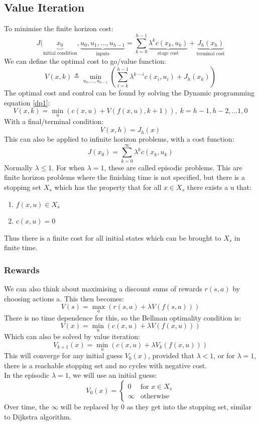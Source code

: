 \documentclass{article}
\begin{document}
\subsection{Value Iteration}
To minimise the finite horizon cost:
\[
J(\underbrace{x_0}_{\text{initial condition}}, \underbrace{u_0,u_1,\hdots,u_{h-1}}_{\text{inputs}} = \sum_{k=0}^{h-1} \underbrace{\lambda^k c(x_k,u_k)}_{\text{stage cost}} + \underbrace{J_h(x_h)}_{\text{terminal cost}}
\]
We can define the optimal cost to go/value function:
\[
V(x,k) \triangleq \min_{u_k,\hdots,u_{h-1}}\left(\sum_{i=k}^{h-1} \lambda^{k-i} c(x_i,u_i) + J_h(x_k)\right)
\]
The optimal cost and control can be found by solving the Dynamic programming equation \eqref{dp1}:
\[
V(x,k) = \min_u (c(x,u) + V(f(x,u),k+1)), \; k=h-1,h-2,...1,0
\]
With a final/terminal condition:
\[
V(x,h) = J_h(x)
\]
This can also be applied to infinite horizon problems, with a cost function:
\[
J(x_0) = \sum_{k=0}^\infty \lambda^k c(x_k,u_k)
\]
Normally $\lambda \leq 1$. For when $\lambda =1$, these are called episodic problems. This are finite horizon problems where the finishing time is not specified, but there is a stopping set $X_s$ which has the property that for all $x \in X_s$ there exists a u that:
\begin{enumerate}
    \item $f(x,u) \in X_s$
    \item $c(x,u) = 0$
\end{enumerate}
Thus there is a finite cost for all initial states which can be brought to $X_s$ in finite time.
\\
\subsubsection*{Rewards}
We can also think about maximising a discount sums of rewards $r(s,a)$ by choosing actions a. This then becomes:
\[
V(s) = \max_a (r(s,a) + \lambda V(f(s,a)))
\]
There is no time dependence for this, so the Bellman optimality condition is:
\[
V(x) = \min_u (c(x,u) + \lambda V(f(x,u)))
\]
Which can also be solved by value iteration:
\[
V_{k+1}(x) = \min_u (c(x,u) + \lambda V_k(f(x,u)))
\]
This will converge for any initial guess $V_0(x)$, provided that $\lambda < 1$, or for $\lambda = 1$, there is a reachable stopping set and no cycles with negative cost. \\
In the episodic $\lambda = 1$, we will use an initial guess:
\[
V_0(x) = \begin{cases}
    0 & \text{for } x \in X_s \\
    \infty & \text{otherwise}
\end{cases}
\]
Over time, the $\infty$ will be replaced by 0 as they get into the stopping set, similar to Dijkstra algorithm.
\end{document}
